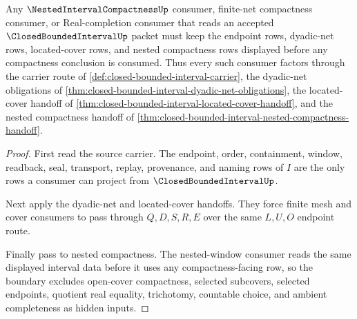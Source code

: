 \begin{theorem}
\label{thm:closed-bounded-interval-compactness-consumer-boundary}
Any $\NestedIntervalCompactnessUp$ consumer, finite-net compactness consumer, or Real-completion consumer that reads an accepted $\ClosedBoundedIntervalUp$ packet must keep the endpoint rows, dyadic-net rows, located-cover rows, and nested compactness rows displayed before any compactness conclusion is consumed. Thus every such consumer factors through the carrier route of \autoref{def:closed-bounded-interval-carrier}, the dyadic-net obligations of \autoref{thm:closed-bounded-interval-dyadic-net-obligations}, the located-cover handoff of \autoref{thm:closed-bounded-interval-located-cover-handoff}, and the nested compactness handoff of \autoref{thm:closed-bounded-interval-nested-compactness-handoff}.
\end{theorem}
\begin{proof}
First read the source carrier. The endpoint, order, containment, window, readback, seal, transport, replay, provenance, and naming rows of $I$ are the only rows a consumer can project from $\ClosedBoundedIntervalUp$.

Next apply the dyadic-net and located-cover handoffs. They force finite mesh and cover consumers to pass through $Q,D,S,R,E$ over the same $L,U,O$ endpoint route.

Finally pass to nested compactness. The nested-window consumer reads the same displayed interval data before it uses any compactness-facing row, so the boundary excludes open-cover compactness, selected subcovers, selected endpoints, quotient real equality, trichotomy, countable choice, and ambient completeness as hidden inputs.
\end{proof}

